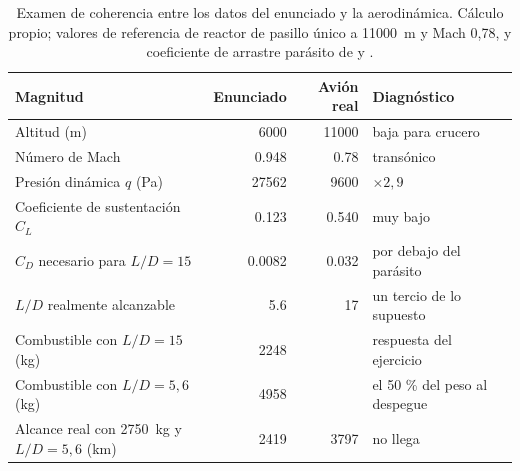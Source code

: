 \documentclass[11pt,letterpaper]{article}
\begin{document}
\begin{table}[htbp]
\small
\caption{Examen de coherencia entre los datos del enunciado y la aerodinámica.
Cálculo propio; valores de referencia de reactor de pasillo único a
\SI{11000}{\meter} y Mach 0,78, y coeficiente de arrastre parásito de
\textcite{anderson1999} y \textcite{raymer2018}.}
\label{cuadro:coherencia}
\begin{tabularx}{\textwidth}{@{}Xrrl@{}}
\toprule
\textbf{Magnitud} & \textbf{Enunciado} & \textbf{Avión real} &
\textbf{Diagnóstico} \\
\midrule
Altitud (\si{\meter})                          & \num{6000}  & \num{11000} &
  baja para crucero \\
Número de Mach                                 & \num{0.948} & \num{0.78}  &
  \textcolor{cAviso}{transónico} \\
Presión dinámica \(q\) (\si{\pascal})          & \num{27562} & \num{9600}  &
  \(\times 2{,}9\) \\
Coeficiente de sustentación \(C_L\)            & \num{0.123} & \num{0.540}  &
  \textcolor{cAviso}{muy bajo} \\
\(C_D\) necesario para \(L/D = 15\)            & \num{0.0082} & \num{0.032} &
  \textcolor{cAviso}{por debajo del parásito} \\
\(L/D\) realmente alcanzable                   & \num{5.6}   & \num{17}    &
  \textcolor{cAviso}{un tercio de lo supuesto} \\
\midrule
Combustible con \(L/D = 15\) (\si{\kilogram})  & \num{2248}  &             &
  respuesta del ejercicio \\
Combustible con \(L/D = 5{,}6\) (\si{\kilogram}) & \num{4958} &            &
  \textcolor{cAviso}{el 50 \% del peso al despegue} \\
Alcance real con \SI{2750}{\kilogram} y \(L/D = 5{,}6\) (\si{\kilo\meter})
  & \num{2419} & \num{3797} & \textcolor{cAviso}{no llega} \\
\bottomrule
\end{tabularx}
\end{table}
\end{document}
